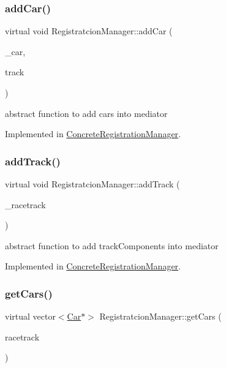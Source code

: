 \subsubsection{\texorpdfstring{add\+Car()}{addCar()}}
{\footnotesize\ttfamily virtual void Registratcion\+Manager\+::add\+Car (\begin{DoxyParamCaption}\item[{\mbox{\hyperlink{class_car}{Car}} $\ast$}]{\+\_\+car,  }\item[{int}]{track }\end{DoxyParamCaption})\hspace{0.3cm}{\ttfamily [pure virtual]}}

abstract function to add cars into mediator 

Implemented in \mbox{\hyperlink{class_concrete_registration_manager_a852824cb63b25c30dd4f626d5097c748}{Concrete\+Registration\+Manager}}.

\mbox{\label{class_registratcion_manager_a7008cf3cb173f6121f94784ed242a7c6}} 
\subsubsection{\texorpdfstring{add\+Track()}{addTrack()}}
{\footnotesize\ttfamily virtual void Registratcion\+Manager\+::add\+Track (\begin{DoxyParamCaption}\item[{\mbox{\hyperlink{class_race_track_component}{Race\+Track\+Component}} $\ast$}]{\+\_\+racetrack }\end{DoxyParamCaption})\hspace{0.3cm}{\ttfamily [pure virtual]}}

abstract function to add track\+Components into mediator 

Implemented in \mbox{\hyperlink{class_concrete_registration_manager_ab7b6cd458f9ff3c5ff7b9413dff48e6a}{Concrete\+Registration\+Manager}}.

\mbox{\label{class_registratcion_manager_a2e06d0bf5f81b2a30d19f242bb2f583d}} 
\subsubsection{\texorpdfstring{get\+Cars()}{getCars()}}
{\footnotesize\ttfamily virtual vector$<$\mbox{\hyperlink{class_car}{Car}}$\ast$$>$ Registratcion\+Manager\+::get\+Cars (\begin{DoxyParamCaption}\item[{int}]{racetrack }\end{DoxyParamCaption})\hspace{0.3cm}{\ttfamily [pure virtual]}}

